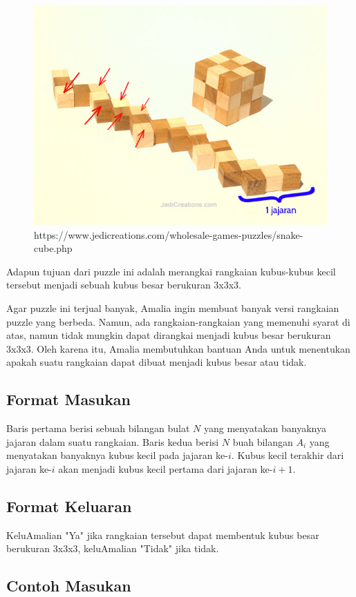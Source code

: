 \documentclass{article}
\begin{document}
\begin{itemize}
  \begin{figure}[h!]
    \centering
    \includegraphics[width=0.4\linewidth]{contoh-1.jpg}
    \caption{https://www.jedicreations.com/wholesale-games-puzzles/snake-cube.php}
  \end{figure}

\end{itemize}

\par\noindent Adapun tujuan dari puzzle ini adalah merangkai rangkaian kubus-kubus kecil tersebut menjadi sebuah kubus besar berukuran 3x3x3.

\par\noindent Agar puzzle ini terjual banyak, Amalia ingin membuat banyak versi rangkaian puzzle yang berbeda. Namun, ada rangkaian-rangkaian yang memenuhi syarat di atas, namun tidak mungkin dapat dirangkai menjadi kubus besar berukuran 3x3x3. Oleh karena itu, Amalia membutuhkan bantuan Anda untuk menentukan apakah suatu rangkaian dapat dibuat menjadi kubus besar atau tidak.

\subsection*{Format Masukan}

\par\noindent Baris pertama berisi sebuah bilangan bulat $N$ yang menyatakan banyaknya jajaran dalam suatu rangkaian. Baris kedua berisi $N$ buah bilangan $A_i$ yang menyatakan banyaknya kubus kecil pada jajaran ke-$i$. Kubus kecil terakhir dari jajaran ke-$i$ akan menjadi kubus kecil pertama dari jajaran ke-$i+1$.

\subsection*{Format Keluaran}

\par\noindent KeluAmalian "Ya" jika rangkaian tersebut dapat membentuk kubus besar berukuran 3x3x3, keluAmalian "Tidak" jika tidak.

\subsection*{Contoh Masukan}
\end{document}
